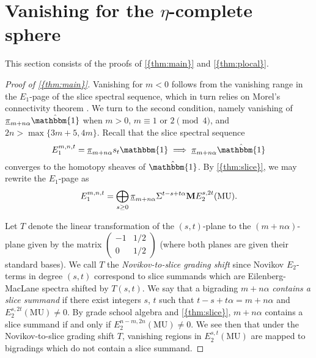\documentclass[10pt]{amsart}
\numberwithin{equation}{section}
\theoremstyle{plain}
\theoremstyle{definition}
\theoremstyle{remark}
\begin{document}
\section{Vanishing for the $\eta$-complete sphere}\label{sec:eta}

This section consists of the proofs of {\autoref{{thm:main}}} and {\autoref{{thm:plocal}}}.

\begin{proof}[Proof of {\autoref{{thm:main}}}]
Vanishing for $m<0$ follows from the vanishing range in the $E_1$-page of the slice spectral sequence, 
which in turn relies on Morel's connectivity theorem \cite{morel:connectivity}.  
We turn to the second condition, namely vanishing of ${\underline{\smash{\pi}}}_{m+n\alpha}\hat {\mathbbm{1}}$ when $m>0$, $m\equiv 1\text{ or }2\pmod 4$, and $2n>\max\{3m+5,4m\}$.  Recall that the slice spectral sequence
\[
  E_1^{m,n,t} = {\underline{\smash{\pi}}}_{m+n\alpha}s_t {\mathbbm{1}}\implies {\underline{\smash{\pi}}}_{m+n\alpha} \hat {\mathbbm{1}}
\]
converges to the homotopy sheaves of $\hat {\mathbbm{1}}$.  By {\autoref{{thm:slice}}}, we may rewrite the $E_1$-page as
\[
  E_1^{m,n,t} = \bigoplus_{s\ge 0} {\underline{\smash{\pi}}}_{m+n\alpha}\Sigma^{t-s+t\alpha}{\mathbf{M}} E_2^{s,2t}({\mathrm{MU}}).
\]

Let $T$ denote the linear transformation of the $(s,t)$-plane to the $(m+n\alpha)$-plane given by the matrix $\begin{pmatrix}-1&1/2\\ 0&1/2\end{pmatrix}$ (where both planes are given their standard bases).  We call $T$ the \emph{Novikov-to-slice grading shift} since Novikov $E_2$-terms in degree $(s,t)$ correspond to slice summands which are Eilenberg-MacLane spectra shifted by $T(s,t)$.  We say that a bigrading $m+n\alpha$ \emph{contains a slice summand} if there exist integers $s$, $t$ such that $t-s+t\alpha = m+n\alpha$ and $E_2^{s,2t}({\mathrm{MU}})\ne 0$.  By grade school algebra and {\autoref{{thm:slice}}}, $m+n\alpha$ contains a slice summand if and only if $E_2^{n-m,2n}({\mathrm{MU}})\ne 0$.  We see then that under the Novikov-to-slice grading shift $T$, vanishing regions in $E_2^{s,t}({\mathrm{MU}})$ are mapped to bigradings which do not contain a slice summand.


\end{proof}
\end{document}
